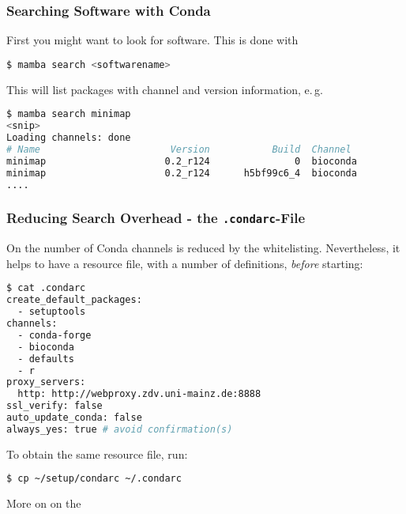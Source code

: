 \begin{frame}[fragile]
  \frametitle{Searching Software with Conda}
  First you might want to look for software. This is done with
  \begin{lstlisting}[language=Bash, style=Shell]
$ mamba search <softwarename>
  \end{lstlisting}
  \pause
  \pause
  This will list packages with channel and version information, e.\,g.
  \begin{lstlisting}[language=Bash, style=Shell, basicstyle=\tiny]
$ mamba search minimap
<snip>
Loading channels: done
# Name                       Version           Build  Channel             
minimap                     0.2_r124               0  bioconda            
minimap                     0.2_r124      h5bf99c6_4  bioconda
....
  \end{lstlisting}
\end{frame}

\begin{frame}[fragile]
  \frametitle{Reducing Search Overhead - the \texttt{.condarc}-File}
  On \mogon{} the number of Conda channels is reduced by the whitelisting. Nevertheless, it helps to have a resource file, with a number of definitions, \emph{before} starting:
  \begin{lstlisting}[language=Bash, style=Shell, basicstyle=\tiny]
$ cat .condarc
create_default_packages:
  - setuptools
channels:
  - conda-forge
  - bioconda
  - defaults
  - r
proxy_servers:
  http: http://webproxy.zdv.uni-mainz.de:8888
ssl_verify: false
auto_update_conda: false
always_yes: true # avoid confirmation(s)
  \end{lstlisting}
  To obtain the same resource file, run:
  \begin{lstlisting}[language=Bash, style=Shell, basicstyle=\footnotesize]
$ cp ~/setup/condarc ~/.condarc
  \end{lstlisting}
  More on  on the 
\end{frame}


